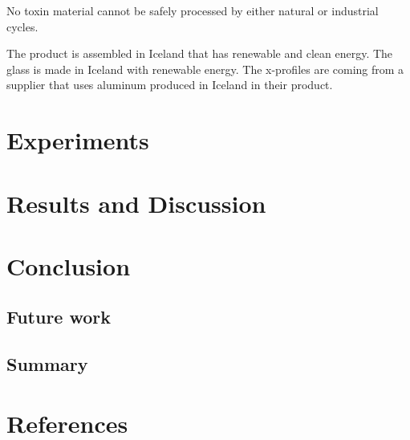 \documentclass[a4paper]{jpconf}
\begin{document}
	No toxin material cannot be safely processed by either natural or industrial cycles.
	
	The product is assembled in Iceland that has renewable and clean energy.
	The glass is made in Iceland with renewable energy.
	The x-profiles are coming from a supplier that uses aluminum produced in Iceland in their product. 
	
	
	\section{Experiments}
	
	\section{Results and Discussion}
	
	\section{Conclusion}
	
	\subsection{Future work}
	
	\subsection{Summary}
	
	\section*{References}
	
	
\end{document}
